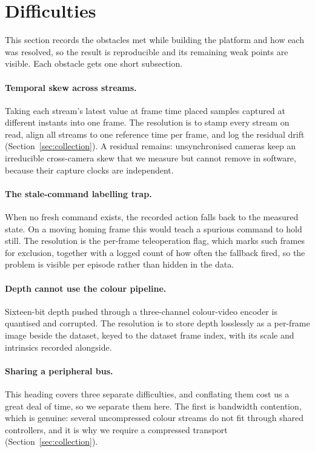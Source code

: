 \section{Difficulties}
\label{sec:difficulties}

This section records the obstacles met while building the platform and how
each was resolved, so the result is reproducible and its remaining weak
points are visible. Each obstacle gets one short subsection.

\paragraph{Temporal skew across streams.} Taking each stream's latest value
at frame time placed samples captured at different instants into one frame.
The resolution is to stamp every stream on read, align all streams to one
reference time per frame, and log the residual drift
(Section~\ref{sec:collection}). A residual remains: unsynchronised cameras
keep an irreducible cross-camera skew that we measure but cannot remove in
software, because their capture clocks are independent.

\paragraph{The stale-command labelling trap.} When no fresh command exists,
the recorded action falls back to the measured state. On a moving homing
frame this would teach a spurious command to hold still. The resolution is
the per-frame teleoperation flag, which marks such frames for exclusion,
together with a logged count of how often the fallback fired, so the
problem is visible per episode rather than hidden in the data.

\paragraph{Depth cannot use the colour pipeline.} Sixteen-bit depth pushed
through a three-channel colour-video encoder is quantised and corrupted.
The resolution is to store depth losslessly as a per-frame image beside the
dataset, keyed to the dataset frame index, with its scale and intrinsics
recorded alongside.

\paragraph{Sharing a peripheral bus.} This heading covers three separate
difficulties, and conflating them cost us a great deal of time, so we separate
them here. The first is bandwidth contention, which is genuine: several
uncompressed colour streams do not fit through shared controllers, and it is why
we require a compressed transport (Section~\ref{sec:collection}).

